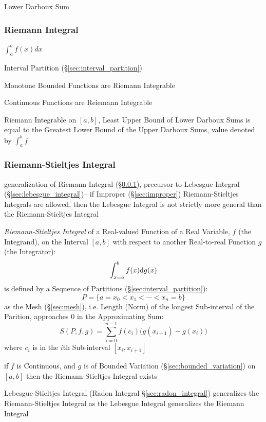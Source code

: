 {Lower Darboux Sum



\subsubsection{Riemann Integral}\label{sec:riemann_integral}

$\int_a^b f(x) dx$

Interval Partition (\S\ref{sec:interval_partition})

Monotone Bounded Functions are Riemann Integrable

Continuous Functions are Reiemann Integrable

Riemann Integrable on $[a,b]$, Least Upper Bound of Lower Darboux Sums
is equal to the Greatest Lower Bound of the Upper Darboux Sums, value
denoted by $\int_a^b f$



\subsubsection{Riemann-Stieltjes Integral}\label{sec:riemann_stieltjes}

generalization of Riemann Integral (\S\ref{sec:riemann_integral}), precursor to
Lebesgue Integral (\S\ref{sec:lebesgue_integral})-- if Improper
(\S\ref{sec:improper}) Riemann-Stieltjes Integrals are allowed, then the
Lebesgue Integral is not strictly more general than the Riemann-Stieltjes
Integral

\emph{Riemann-Stieltjes Integral} of a Real-valued Function of a Real Variable,
$f$ (the Integrand), on the Interval $[a,b]$ with respect to another
Real-to-real Function $g$ (the Integrator):
\[
  \int_{x=a}^b f(x) \mathrm{d}g(x)
\]
is defined by a Sequence of Partitions (\S\ref{sec:interval_partition}):
\[
  P = \{ a = x_0 < x_1 < \cdots < x_n = b \}
\]
as the Mesh (\S\ref{sec:mesh}), i.e. Length (Norm) of the longest Sub-interval
of the Parition, approaches $0$ in the Approximating Sum:
\[
  S(P, f, g) = \sum_{i=0}^{n-1} f(c_i) \big(g(x_{i+1}) - g(x_i)\big)
\]
where $c_i$ is in the $i$th Sub-interval $[x_i, x_{i+1}]$

if $f$ is Continuous, and $g$ is of Bounded Variation
(\S\ref{sec:bounded_variation}) on $[a, b]$ then the Riemann-Stieltjes Integral
exists

\fist Lebesgue-Stieltjes Integral (Radon Integral \S\ref{sec:radon_integral})
generalizes the Riemann-Stieltjes Integral as the Lebesgue Integral generalizes
the Riemann Integral

}
